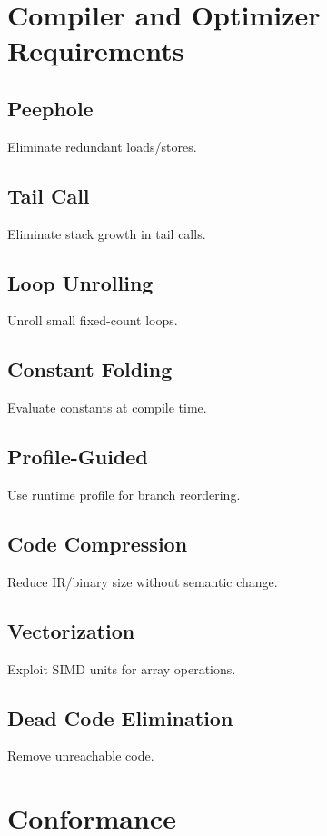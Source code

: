 \documentclass[12pt,a4paper]{article}
\begin{document}
\section{Compiler and Optimizer Requirements}

\subsection{Peephole}
Eliminate redundant loads/stores.

\subsection{Tail Call}
Eliminate stack growth in tail calls.

\subsection{Loop Unrolling}
Unroll small fixed-count loops.

\subsection{Constant Folding}
Evaluate constants at compile time.

\subsection{Profile-Guided}
Use runtime profile for branch reordering.

\subsection{Code Compression}
Reduce IR/binary size without semantic change.

\subsection{Vectorization}
Exploit SIMD units for array operations.

\subsection{Dead Code Elimination}
Remove unreachable code.

\section{Conformance}
\end{document}
